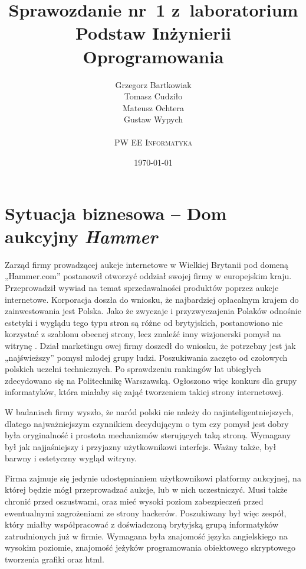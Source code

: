 \documentclass[10pt,a4paper]{article}
\begin{document}
\title{
  Sprawozdanie nr~1 z~laboratorium\\Podstaw Inżynierii Oprogramowania
}
\author{
  Grzegorz Bartkowiak\\
  Tomasz Cudziło\\
  Mateusz Ochtera\\
  Gustaw Wypych\\
  \\
  \textsc{PW EE Informatyka}\\[10pt]
}
\date{\today}

\maketitle

\section{Sytuacja biznesowa -- Dom aukcyjny \emph{Hammer}}
Zarząd firmy prowadzącej aukcje internetowe w Wielkiej Brytanii pod domeną
„Hammer.com” postanowił otworzyć oddział swojej firmy w europejskim kraju.
Przeprowadził wywiad na temat sprzedawalności produktów poprzez aukcje
internetowe. Korporacja doszła do wniosku, że najbardziej opłacalnym krajem do
zainwestowania jest Polska. Jako że zwyczaje i przyzwyczajenia Polaków odnośnie
estetyki i wyglądu tego typu stron są różne od brytyjskich, postanowiono nie
korzystać z szablonu obecnej strony, lecz znaleźć inny wizjonerski pomysł na
witrynę . Dział marketingu owej firmy doszedł do wniosku, że potrzebny jest jak
„najświeższy” pomysł młodej grupy ludzi. Poszukiwania zaczęto od czołowych
polskich uczelni technicznych. Po sprawdzeniu rankingów lat ubiegłych
zdecydowano się na Politechnikę Warszawską. Ogłoszono więc konkurs dla grupy
informatyków, która miałaby się zająć tworzeniem takiej strony internetowej.

W badaniach firmy wyszło, że naród polski nie należy do najinteligentniejszych,
dlatego najważniejszym czynnikiem decydującym o tym czy pomysł jest dobry była
oryginalność i prostota mechanizmów sterujących taką stroną. Wymagany był jak
najjaśniejszy i przyjazny użytkownikowi interfejs. Ważny także, był barwny i
estetyczny wygląd witryny.

Firma zajmuje się jedynie udostępnianiem użytkownikowi platformy aukcyjnej, na
której będzie mógł przeprowadzać aukcje, lub w nich uczestniczyć. Musi także
chronić przed oszustwami, oraz mieć wysoki poziom zabezpieczeń przed
ewentualnymi zagrożeniami ze strony hackerów. Poszukiwany był więc zespół,
który miałby współpracować z doświadczoną brytyjską grupą informatyków
zatrudnionych już w firmie. Wymagana była znajomość języka angielskiego na
wysokim poziomie, znajomość jeżyków programowania obiektowego skryptowego
tworzenia grafiki oraz html.
\end{document}
